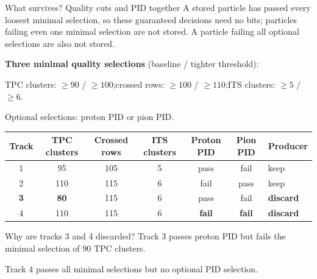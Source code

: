 \begin{frame}[shrink=8]{What survives? Quality cuts and PID together}
        \small
        A stored particle has passed every loosest minimal selection,
        so these guaranteed decisions need no bits; particles failing
        even one minimal selection are not stored.
        A particle failing all optional selections are also not stored.
        \medskip\par
        \textbf{Three minimal quality selections} (baseline / tighter
        threshold):
        \par TPC clusters: $\geq 90$ / $\geq 100$;\quad crossed rows:
        $\geq 100$ / $\geq 110$;\quad ITS clusters: $\geq 5$ / $\geq 6$.
        \medskip\par
        Optional selections: proton PID or pion PID.
        \medskip
        \centering
        \renewcommand{\arraystretch}{1.3}
        \begin{tabular}{cccccc l}
                \toprule
                Track & TPC clusters & Crossed rows & ITS clusters &
                Proton PID & Pion PID & Producer\\
                \midrule
                1 & 95 & 105 & 5 & pass & fail & keep\\
                2 & 110 & 115 & 6 & fail & pass & keep\\
                \textbf{3} & \textbf{80} & 115 & 6 & pass & fail &
                \textbf{discard}\\
                4 & 110 & 115 & 6 & \textbf{fail} & \textbf{fail} &
                \textbf{discard}\\
                \bottomrule
        \end{tabular}
        \medskip
        \begin{block}{Why are tracks 3 and 4 discarded?}
                Track 3 passes proton PID but fails the minimal
                selection of 90 TPC clusters.\par
                Track 4 passes all minimal selections but no optional
                PID selection.
        \end{block}
\end{frame}

